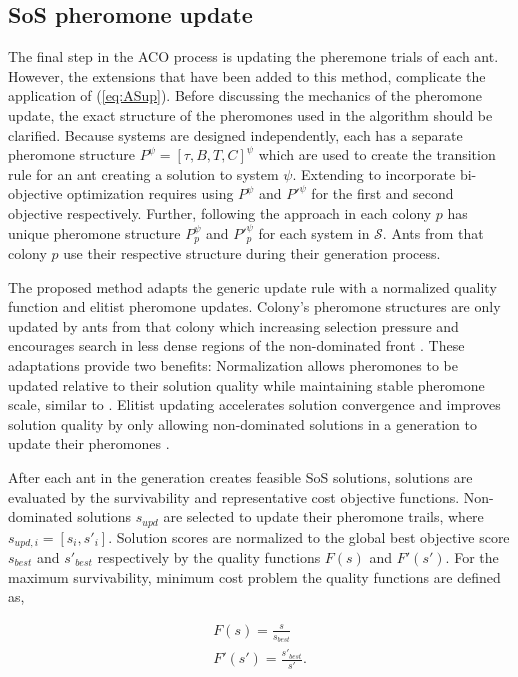 \documentclass[preprint,12pt,authoryear]{elsarticle}
\begin{document}
\subsection{SoS pheromone update}
The final step in the ACO process is updating the pheremone trials of each ant. However, the extensions that have been added to this method, complicate the application of (\ref{eq:ASup}). Before discussing the mechanics of the pheromone update, the exact structure of the pheromones used in the algorithm should be clarified. Because systems are designed independently, each has a separate pheromone structure $P^{\psi}=[\tau,B,T,C]^\psi$ which are used to create the transition rule for an ant creating a solution to system $\psi$. Extending to incorporate bi-objective optimization requires using $P^\psi$ and $P'^{\psi}$ for the first and second objective respectively. Further, following the approach in \cite{Iredi2001} each colony $p$ has unique pheromone structure $P^\psi_p$ and $P'^{\psi}_p$ for each system in $\mathcal{S}$. Ants from that colony $p$ use their respective structure during their generation process.  

The proposed method adapts the generic update rule with a normalized quality function and elitist pheromone updates. Colony's pheromone structures are only updated by ants from that colony which increasing selection pressure and encourages search in less dense regions of the non-dominated front \citep{Iredi2001}. These adaptations provide two benefits: Normalization allows pheromones to be updated relative to their solution quality while maintaining stable pheromone scale, similar to \cite{Blum2004}. Elitist updating accelerates solution convergence and improves solution quality by only allowing non-dominated solutions in a generation to update their pheromones \citep{Iredi2001}. 

After each ant in the generation creates feasible SoS solutions, solutions are evaluated by the survivability and representative cost objective functions. Non-dominated solutions $s_{upd}$ are selected to update their pheromone trails, where $s_{upd,i}=[s_i,s'_i]$. Solution scores are normalized to the global best objective score $s_{best}$ and $s'_{best}$ respectively by the quality functions $F(s)$ and $F'(s')$. For the maximum survivability, minimum cost problem the quality functions are defined as,

\begin{equation}
	\begin{split}
		F(s)=\frac{s}{s_{best}}\\
		F'(s')=\frac{s'_{best}}{s'}.
	\end{split}
	\label{eq:Qual}
\end{equation}
\end{document}
